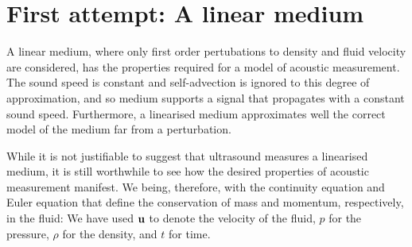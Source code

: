 \section{First attempt: A linear medium}\label{sec:linearFluid}


A linear medium, where only first order pertubations to density and fluid velocity are considered,
has the properties required for a model of acoustic measurement.
The sound speed is constant and self-advection is ignored to this degree of approximation,
and so medium supports a signal that propagates with a constant sound speed.
Furthermore, a linearised medium approximates well the correct model of the medium far from a perturbation.

While it is not justifiable to suggest that ultrasound measures a linearised medium,
it is still worthwhile to see how the desired properties of acoustic measurement manifest.
We being, therefore, with the continuity equation and Euler equation that define the conservation of mass and momentum, respectively,
in the fluid:
%
%
We have used  $\textbf{u}$ to denote the velocity of the fluid, $p$ for the pressure, $\rho$ for the density, and $t$ for time.

